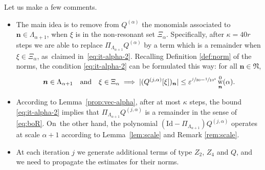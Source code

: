 \documentclass[10pt,a4paper]{amsart}
\DeclareMathOperator{\rw}{w}
\theoremstyle{plain}
\theoremstyle{definition}
\newcommand{\nb}{{\boldsymbol n}}
\newcommand{\Nb}{{\boldsymbol{\mathfrak{N}}}}
\newcommand{\1}{\mathbf{1}}
\let\epsilon\varepsilon
\begin{document}
Let us make a few comments.

\begin{itemize}
\item The main idea is to remove from $Q^{(\alpha)}$ the monomials associated to $\nb\in\Lambda_{\alpha+1}$, when $\xi$ is in the non-resonant set $\Xi_{\alpha}$. Specifically, after $\kappa=40r$ steps we are able to replace $\Pi_{\Lambda_{\alpha+1}}Q^{(\alpha)}$ by a term which is a remainder when $\xi\in\Xi_{\alpha}$, as~claimed in~\eqref{eq:it-alpha-2}. Recalling Definition \ref{def:norm} of the norms, the condition \eqref{eq:it-alpha-2} can be formulated this way: for all $\nb\in\Nb$,
\begin{equation}
\label{eq:it-alpha-2bis}
\nb\in\Lambda_{\alpha+1}\quad \text{and}
\quad \xi\in \Xi_{\alpha}
\implies |(Q^{(j,\alpha)}[\xi])_{\nb}| \leq
\epsilon^{\sfrac{j}{30}-\sfrac{1}{10^{4}}}\rw_{\nb}^{0}(\alpha).
\end{equation}
\item According to Lemma~\ref{prop:vec-alpha}, after at most $\kappa$ steps, the bound \eqref{eq:it-alpha-2} implies that $\Pi_{\Lambda_{\alpha+1}}Q^{(j,\alpha)}$ is a remainder in the sense of \eqref{eq:boR}. On~the other hand, the polynomial $(\mathrm{Id}-\Pi_{\Lambda_{\alpha+1}})Q^{(j,\alpha)}$ operates at scale $\alpha+1$ according to Lemma~\ref{lem:scale} and Remark \ref{rem:scale}.
\item At each iteration $j$ we generate additional terms of type $Z_{2}$, $Z_{4}$ and $Q$, and we need to propagate the estimates for their norms.
\end{itemize}
\end{document}
